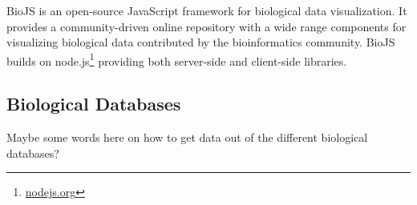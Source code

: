 BioJS is an open-source JavaScript framework for biological data
visualization.\cite{gomez2013biojs} It provides a community-driven online
repository with a wide range components for visualizing biological data
contributed by the bioinformatics community. BioJS builds on
node.js\footnote{\url{nodejs.org}} providing both server-side and client-side
libraries. 


\subsection*{Biological Databases} 
Maybe some words here on how to get data out of the different biological
databases? 
